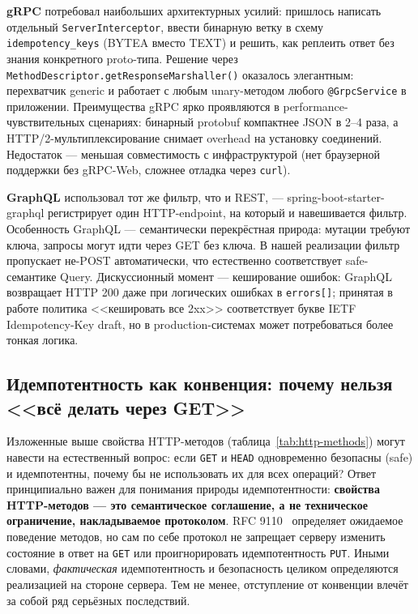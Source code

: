 \textbf{gRPC} потребовал наибольших архитектурных усилий: пришлось написать отдельный \texttt{ServerInterceptor}, ввести бинарную ветку в схему \texttt{idempotency\_keys} (BYTEA вместо TEXT) и решить, как реплеить ответ без знания конкретного proto-типа. Решение через \texttt{MethodDescriptor.getResponseMarshaller()} оказалось элегантным: перехватчик generic и работает с любым unary-методом любого \texttt{@GrpcService} в приложении. Преимущества gRPC ярко проявляются в performance-чувствительных сценариях: бинарный protobuf компактнее JSON в 2--4 раза, а HTTP/2-мультиплексирование снимает overhead на установку соединений. Недостаток --- меньшая совместимость с инфраструктурой (нет браузерной поддержки без gRPC-Web, сложнее отладка через \texttt{curl}).

\textbf{GraphQL} использовал тот же фильтр, что и REST, --- spring-boot-starter-graphql регистрирует один HTTP-endpoint, на который и навешивается фильтр. Особенность GraphQL --- семантически перекрёстная природа: мутации требуют ключа, запросы могут идти через GET без ключа. В нашей реализации фильтр пропускает не-POST автоматически, что естественно соответствует safe-семантике Query. Дискуссионный момент --- кеширование ошибок: GraphQL возвращает HTTP 200 даже при логических ошибках в \texttt{errors[]}; принятая в работе политика <<кешировать все 2xx>> соответствует букве IETF Idempotency-Key draft, но в production-системах может потребоваться более тонкая логика.

\subsection{Идемпотентность как конвенция: почему нельзя <<всё делать через GET>>}
\label{subsec:method-convention}

Изложенные выше свойства HTTP-методов (таблица~\ref{tab:http-methods}) могут навести на естественный вопрос: если \texttt{GET} и \texttt{HEAD} одновременно безопасны (safe) и идемпотентны, почему бы не использовать их для всех операций? Ответ принципиально важен для понимания природы идемпотентности: \textbf{свойства HTTP-методов --- это семантическое соглашение, а не техническое ограничение, накладываемое протоколом}. RFC 9110~\cite{rfc9110} определяет ожидаемое поведение методов, но сам по себе протокол не запрещает серверу изменить состояние в ответ на \texttt{GET} или проигнорировать идемпотентность \texttt{PUT}. Иными словами, \emph{фактическая} идемпотентность и безопасность целиком определяются реализацией на стороне сервера. Тем не менее, отступление от конвенции влечёт за собой ряд серьёзных последствий.

